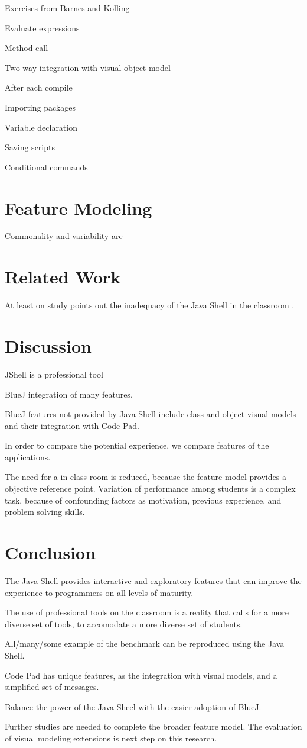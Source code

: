 \documentclass{article}
\begin{document}
Exercises from Barnes and Kolling

Evaluate expressions

Method call

Two-way integration with visual object model

After each compile

Importing packages

Variable declaration

Saving scripts

Conditional commands


\section{Feature Modeling}
Commonality and variability are

\section{Related Work}

At least on study points out the inadequacy of the Java Shell in the classroom
\cite{politz_minnes2018jshell}.

\section{Discussion}

JShell is a professional tool

BlueJ integration of many features.

BlueJ features not provided by Java Shell include class and object visual models and their integration with Code Pad.

In order to compare the potential experience, we compare features of the applications.

The need for a in class room is reduced, because the feature model provides a objective reference point. Variation of performance among students is a complex task, because of confounding factors as motivation, previous experience, and problem solving skills.


\section{Conclusion}

The Java Shell provides interactive and exploratory features that can improve the experience to programmers on all levels of maturity.

The use of professional tools on the classroom is a reality that calls for a more diverse set of tools, to accomodate a more diverse set of students.

All/many/some example of the benchmark can be reproduced using the Java Shell.

Code Pad has unique features, as the integration with visual models, and a simplified set of messages. 


Balance the power of the Java Sheel with the easier adoption of BlueJ.

Further studies are needed to complete the broader feature model. The evaluation of visual modeling extensions is next step on this research.




\end{document}
